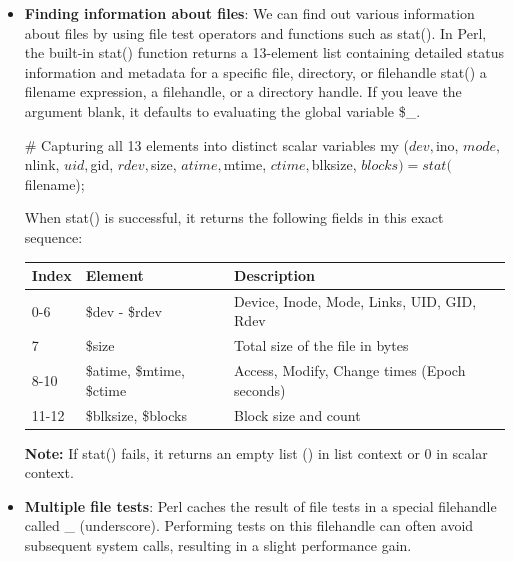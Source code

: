 \documentclass{report}
\begin{document}
\begin{itemize}
\begin{perlcode}
                # or equivalently...
                die "Config file doesn’t exist" unless -e "config.txt";
            \end{perlcode}
        \item \textbf{Finding information about files}: We can find out various information about files by using file test operators and functions such as stat().
            \bigbreak \noindent 
            In Perl, the built-in stat() function returns a 13-element list containing detailed status information and metadata for a specific file, directory, or filehandle
            \bigbreak \noindent 
            stat() a filename expression, a filehandle, or a directory handle. If you leave the argument blank, it defaults to evaluating the global variable \$\_.
            \bigbreak \noindent 
            \begin{perlcode}
                # Capturing all 13 elements into distinct scalar variables
                my ($dev, $ino, $mode, $nlink, $uid, $gid, $rdev, $size, 
                    $atime, $mtime, $ctime, $blksize, $blocks) = stat($filename);
            \end{perlcode}
            \bigbreak \noindent 
            When stat() is successful, it returns the following fields in this exact sequence:
            \bigbreak \noindent 
            \begin{center}
                \begin{tabularx}{\textwidth}{@{}lXX@{}}
                    \toprule
                    \textbf{Index}& \textbf{Element}& \textbf{Description}\\
                    \midrule
                    0-6& \$dev - \$rdev &Device, Inode, Mode, Links, UID, GID, Rdev \\[2ex]
                    7 &\$size &Total size of the file in bytes\\[2ex]
                    8-10& \$atime, \$mtime, \$ctime &Access, Modify, Change times (Epoch seconds)\\[2ex]
                    11-12& \$blksize, \$blocks &Block size and count \\
                    \bottomrule
                \end{tabularx}
            \end{center}
            \textbf{Note:} If stat() fails, it returns an empty list () in list context or 0 in scalar context.
        \item \textbf{Multiple file tests}: Perl caches the result of file tests in a special filehandle called \_ (underscore). Performing tests on this filehandle can often avoid subsequent system calls, resulting in a slight performance gain.

\end{itemize}
\end{document}
